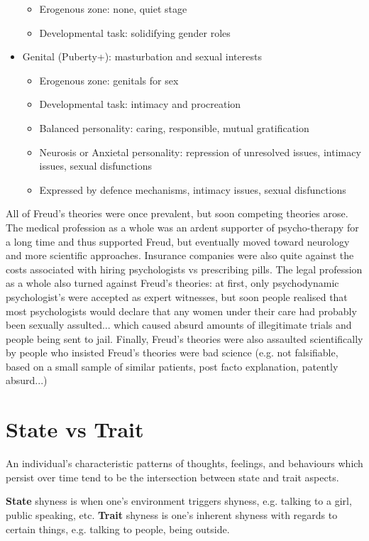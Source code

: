 \documentclass[12pt]{article}
\begin{document}
\begin{itemize}
\begin{itemize}
\item Erogenous zone: none, quiet stage
\item Developmental task: solidifying gender roles
\end{itemize}
\item Genital (Puberty+): masturbation and sexual interests
\begin{itemize}
\item Erogenous zone: genitals for sex
\item Developmental task: intimacy and procreation
\item Balanced personality: caring, responsible, mutual gratification
\item Neurosis or Anxietal personality: repression of unresolved issues, intimacy issues, sexual disfunctions
\item Expressed by defence mechanisms, intimacy issues, sexual disfunctions
\end{itemize}
\end{itemize}

All of Freud's theories were once prevalent, but soon competing theories arose. The medical profession as a whole was an ardent supporter of psycho-therapy for a long time and thus supported Freud, but eventually moved toward neurology and more scientific approaches. Insurance companies were also quite against the costs associated with hiring psychologists vs prescribing pills. The legal profession as a whole also turned against Freud's theories: at first, only psychodynamic psychologist's were accepted as expert witnesses, but soon people realised that most psychologists would declare that any women under their care had probably been sexually assulted... which caused absurd amounts of illegitimate trials and people being sent to jail. Finally, Freud's theories were also assaulted scientifically by people who insisted Freud's theories were bad science (e.g. not falsifiable, based on a small sample of similar patients, post facto explanation, patently absurd...)

\section*{State vs Trait}
An individual's characteristic patterns of thoughts, feelings, and behaviours which persist over time tend to be the intersection between state and trait aspects.

{\bf State} shyness is when one's environment triggers shyness, e.g. talking to a girl, public speaking, etc. {\bf Trait} shyness is one's inherent shyness with regards to certain things, e.g. talking to people, being outside.
\end{document}
